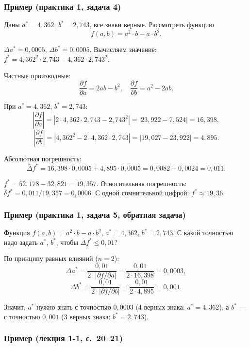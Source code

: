 \subsubsection*{Пример (практика 1, задача 4)}

Даны $a^* = 4{,}362$, $b^* = 2{,}743$, все знаки верные. Рассмотреть функцию
\[
    f(a, b) = a^2 \cdot b - a \cdot b^2.
\]

$\Delta a^* = 0{,}0005$, $\Delta b^* = 0{,}0005$. Вычисляем значение: $f^* = 4{,}362^2 \cdot 2{,}743 - 4{,}362 \cdot 2{,}743^2$.

Частные производные:
\[
    \frac{\partial f}{\partial a} = 2ab - b^2, \quad
    \frac{\partial f}{\partial b} = a^2 - 2ab.
\]

При $a^* = 4{,}362$, $b^* = 2{,}743$:
\[
    \left|\frac{\partial f}{\partial a}\right| = |2 \cdot 4{,}362 \cdot 2{,}743 - 2{,}743^2| = |23{,}922 - 7{,}524| = 16{,}398,
\]
\[
    \left|\frac{\partial f}{\partial b}\right| = |4{,}362^2 - 2 \cdot 4{,}362 \cdot 2{,}743| = |19{,}027 - 23{,}922| = 4{,}895.
\]

Абсолютная погрешность:
\[
    \overline{\Delta} f^* = 16{,}398 \cdot 0{,}0005 + 4{,}895 \cdot 0{,}0005 = 0{,}0082 + 0{,}0024 = 0{,}011.
\]

$f^* = 52{,}178 - 32{,}821 = 19{,}357$. Относительная погрешность: $\overline{\delta} f^* = 0{,}011/19{,}357 = 0{,}0006$. С одной сомнительной цифрой: $f^* \approx 19{,}36$.

\subsubsection*{Пример (практика 1, задача 5, обратная задача)}

Функция $f(a,b) = a^2 \cdot b - a \cdot b^2$, $a^* = 4{,}362$, $b^* = 2{,}743$. С какой точностью надо задать $a^*$, $b^*$, чтобы $\overline{\Delta} f^* \leq 0{,}01$?

По принципу равных влияний ($n = 2$):
\[
    \Delta a^* = \frac{0{,}01}{2 \cdot |\partial f/\partial a|} = \frac{0{,}01}{2 \cdot 16{,}398} = 0{,}0003,
\]
\[
    \Delta b^* = \frac{0{,}01}{2 \cdot |\partial f/\partial b|} = \frac{0{,}01}{2 \cdot 4{,}895} = 0{,}001.
\]

Значит, $a^*$ нужно знать с точностью $0{,}0003$ (4 верных знака: $a^* = 4{,}362$), а $b^*$ --- с точностью $0{,}001$ (3 верных знака: $b^* = 2{,}743$).

\subsubsection*{Пример (лекция 1-1, с.~20--21)}

